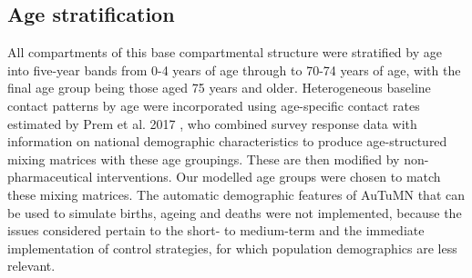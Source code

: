 \subsection{Age stratification}
All compartments of this base compartmental structure were stratified by age into five-year bands from 0-4 years of age through to 70-74 years of age, with the final age group being those aged 75 years and older. Heterogeneous baseline contact patterns by age were incorporated using age-specific contact rates estimated by Prem et al. 2017 \cite{RN19}, who combined survey response data with information on national demographic characteristics to produce age-structured mixing matrices with these age groupings. These are then modified by non-pharmaceutical interventions. Our modelled age groups were chosen to match these mixing matrices. The automatic demographic features of AuTuMN that can be used to simulate births, ageing and deaths were not implemented, because the issues considered pertain to the short- to medium-term and the immediate implementation of control strategies, for which population demographics are less relevant.
